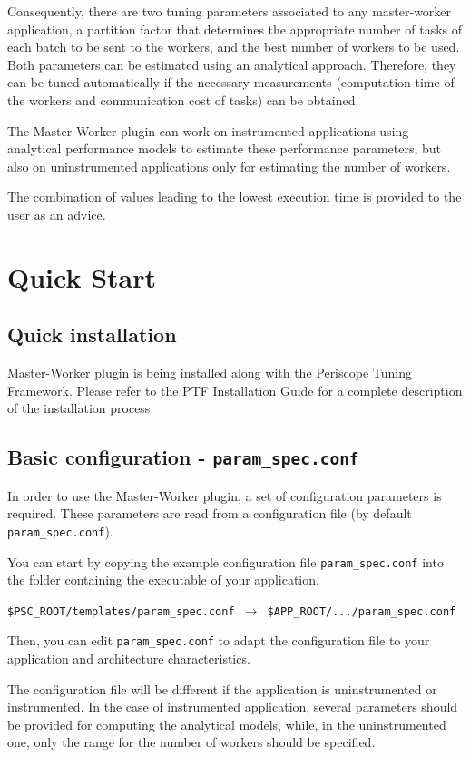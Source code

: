 \documentclass[11pt,a4paper, oneside]{book} %
\begin{document}
Consequently, there are two tuning parameters associated to any master-worker application, a partition factor that determines the appropriate number of tasks of each batch to be sent to the workers, and the best number of workers to be used. Both parameters can be estimated using an analytical approach. Therefore, they can be tuned automatically if the necessary measurements (computation time of the workers and  communication cost of tasks) can be obtained.

The Master-Worker plugin can work on instrumented applications using analytical performance models to estimate these performance parameters, but also on uninstrumented applications only for estimating the number of workers.

The combination of values leading to the lowest execution time is provided to the user as an advice.

\chapter{Quick Start}
\section{Quick installation}
Master-Worker plugin is being installed along with the Periscope Tuning Framework. Please refer to the PTF Installation Guide for a complete description of the installation process.

\section{Basic configuration - \texttt{param\_spec.conf}}
In order to use the Master-Worker plugin, a set of configuration parameters is required. These parameters are read from a configuration file (by default \texttt{param\_spec.conf}).

You can start by copying the example configuration file \texttt{param\_spec.conf} into the folder containing the executable of your application.
\begin{center}
\texttt{\$PSC\_ROOT/templates/param\_spec.conf $\rightarrow$ \$APP\_ROOT/.../param\_spec.conf}
\end{center}


Then, you can edit \texttt{param\_spec.conf} to adapt the configuration file to your application and architecture characteristics.

The configuration file will be different if the application is uninstrumented or instrumented. In the case of instrumented application, several parameters should be provided for computing the analytical models, while, in the uninstrumented one, only the range for the number of workers should be specified.
\end{document}
